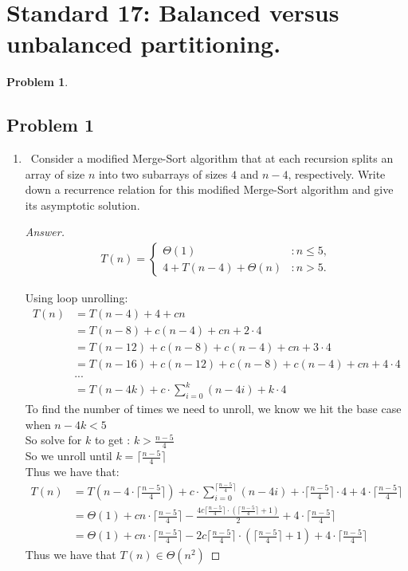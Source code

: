 \documentclass[11pt]{article}
\theoremstyle{definition}
\theoremstyle{definition}
\newtheorem{required}{Problem}
\theoremstyle{definition}
\begin{document}
\newpage
\section{Standard 17: Balanced versus unbalanced partitioning.}

\begin{required}
\subsection{Problem 1}
\begin{enumerate}[label=(\alph*)]
\item \label{(a).}~Consider a modified Merge-Sort algorithm that at each recursion splits an array of size $n$  into two subarrays of sizes $4$ and $n-4$, respectively. Write down a recurrence relation for this modified Merge-Sort algorithm and give its asymptotic solution.

\begin{proof}[Answer]
\begin{align*}
T(n) = \begin{cases}
\Theta(1) & : n \leq 5, \\
4+T(n - 4) + \Theta(n) & : n > 5.
\end{cases}
\end{align*}

Using loop unrolling:
\begin{align*}
T(n) &= T(n-4)+4+cn\\
&= T(n-8)+c(n-4)+cn + 2\cdot4 \\
&= T(n-12) + c(n-8)+c(n-4)+cn + 3\cdot4 \\
&= T(n-16)+ c(n-12) + c(n-8)+c(n-4)+cn + 4\cdot4 \\
&... \\
						&=T(n-4k)+c\cdot \sum_{i=0}^{k}(n-4i) + k\cdot4
\end{align*}
To find the number of times we need to unroll, we know we hit the base case when $n-4k <5$\\
So solve for $k$ to get : $k>\frac{n-5}{4}$\\
So we unroll until $k = \lceil\frac{n-5}{4} \rceil$ \\
Thus we have that: \\
\begin{align*}
T(n) &=T(n-4\cdot\lceil\frac{n-5}{4} \rceil)+c\cdot\sum_{i=0}^{\lceil\frac{n-5}{4} \rceil}(n-4i) + \cdot\lceil\frac{n-5}{4} \rceil \cdot 4 + 4\cdot\lceil\frac{n-5}{4} \rceil \\
&=\Theta(1)+cn \cdot \lceil\frac{n-5}{4} \rceil - \frac {4c\lceil\frac{n-5}{4} \rceil\cdot (\lceil\frac{n-5}{4} \rceil +1) } {2}  + 4\cdot\lceil\frac{n-5}{4} \rceil \\
&=\Theta(1)+cn\cdot \lceil\frac{n-5}{4} \rceil - 2c\lceil\frac{n-5}{4} \rceil\cdot (\lceil\frac{n-5}{4} \rceil +1) +  4\cdot\lceil\frac{n-5}{4} \rceil 
\end{align*}
Thus we have that $T(n) \in \Theta(n^2)$


\end{proof}
\end{enumerate}
\end{required}
\end{document}
